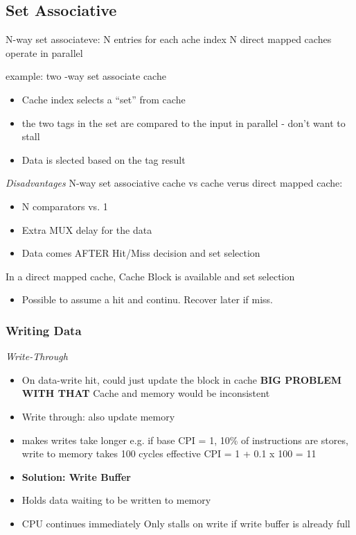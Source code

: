 \subsection{Set Associative}
N-way set associateve: N entries for each ache index\newline
N direct mapped caches operate in parallel

example: two -way set associate cache\newline
\begin{itemize}
\item Cache index selects a ``set'' from cache
\item the two tags in the set are compared to the input in parallel - don't want to stall
\item Data is slected based on the tag result
\end{itemize}


\textit{Disadvantages}
N-way set associative cache vs cache verus direct mapped cache:\newline
\begin{itemize}
\item N comparators vs. 1
\item Extra MUX delay for the data
\item Data comes AFTER Hit/Miss decision and set selection
\end{itemize}

In a direct mapped cache, Cache Block is available and set selection\newline
\begin{itemize}
\item Possible to assume a hit and continu. Recover later if miss.
\end{itemize}



\subsubsection{Writing Data}

\textit{Write-Through}
\begin{itemize}
\item On data-write hit, could just update the block in cache
\subitem \textbf{BIG PROBLEM WITH THAT}
\subitem Cache and memory would be inconsistent
\item Write through: also update memory
\item makes writes take longer
\subitem e.g. if base CPI = 1, 10\% of instructions are stores, write to memory takes 100 cycles
\subitem effective CPI = 1 + 0.1 x 100 = 11
\item \textbf{Solution: Write Buffer}
\item Holds data waiting to be written to memory
\item CPU continues immediately
\subitem Only stalls on write if write buffer is already full
\end{itemize}

